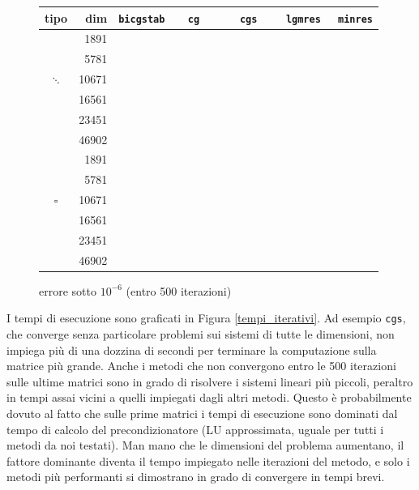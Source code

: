 \documentclass[11pt,a4paper]{scrartcl}
\newcommand{\yep}{\ding{51}}%
\newcommand{\nope}{\ding{55}}%
\begin{document}
\begin{figure}[!ht]
\centering
\begin{tabular}{cr|ccccc}
\toprule
tipo & dim & \verb|bicgstab| & \verb|  cg   | & \verb|  cgs  | & \verb| lgmres| & \verb| minres| \\
\midrule
\multirow{5}{*}{$\ddots$} & {1891} & \yep & \yep & \yep & \yep & \yep \\
& {5781} & \yep & \yep & \yep & \yep & \yep \\
& {10671} & \yep & \yep & \yep & \yep & \yep \\
& {16561} & \yep & \yep  & \yep & \yep & \nope \\
& {23451} & \yep & \nope & \yep & \yep & \nope \\
& {46902} & \nope & \nope & \yep & \yep & \nope \\ 
\midrule
\multirow{5}{*}{$\square$} & {1891} & \yep & \yep & \yep & \yep & \yep \\
& {5781} & \yep & \yep & \yep & \yep & \yep \\
& {10671} & \yep & \yep & \yep & \yep & \yep \\
& {16561} & \yep & \yep  & \yep & \yep & \nope \\
& {23451} & \yep & \nope & \yep & \yep & \nope \\
& {46902} & \yep & \nope & \yep & \yep & \nope \\ 
\bottomrule
\end{tabular}
\caption{errore sotto $10^{-6}$ (entro 500 iterazioni)}
\label{tabella2}
\end{figure}

I tempi di esecuzione sono graficati in Figura \ref{tempi_iterativi}. Ad esempio \texttt{cgs}, che converge senza particolare problemi sui sistemi di tutte le dimensioni, non impiega più di una dozzina di secondi per terminare la computazione sulla matrice più grande. Anche i metodi che non convergono entro le 500 iterazioni sulle ultime matrici sono in grado di risolvere i sistemi lineari più piccoli, peraltro in tempi assai vicini a quelli impiegati dagli altri metodi. Questo è probabilmente dovuto al fatto che sulle prime matrici i tempi di esecuzione sono dominati dal tempo di calcolo del precondizionatore (LU approssimata, uguale per tutti i metodi da noi testati). Man mano che le dimensioni del problema aumentano, il fattore dominante diventa il tempo impiegato nelle iterazioni del metodo, e solo i metodi più performanti si dimostrano in grado di convergere in tempi brevi. 
\end{document}
